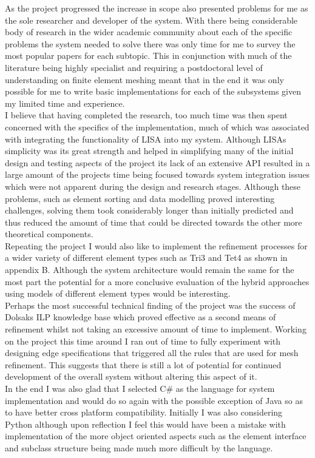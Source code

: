 \noindent
As the project progressed the increase in scope also presented problems for me as the sole researcher and developer of the system. With there being considerable body of research in the wider academic community about each of the specific problems the system needed to solve there was only time for me to survey the most popular papers for each subtopic. This in conjunction with much of the literature being highly specialist and requiring a postdoctoral level of understanding on finite element meshing meant that in the end it was only possible for me to write basic implementations for each of the subsystems given my limited time and experience. \\ 
  
\noindent
I believe that having completed the research, too much time was then spent concerned with the specifics of the implementation, much of which was associated with integrating the functionality of LISA into my system. Although LISAs simplicity was its great strength and helped in simplifying many of the initial design and testing aspects of the project its lack of an extensive API resulted in a large amount of the projects time being focused towards system integration issues which were not apparent during the design and research stages. Although these problems, such as element sorting and data modelling proved interesting challenges, solving them took considerably longer than initially predicted and thus reduced the amount of time that could be directed towards the other more theoretical components. \\ 


\noindent
Repeating the project I would also like to implement the refinement processes for a wider variety of different element types such as Tri3 and Tet4 as shown in appendix B. Although the system architecture would remain the same for the most part the potential for a more conclusive evaluation of the hybrid approaches using models of different element types would be interesting. \\ 

\noindent
Perhaps the most successful technical finding of the project was the success of Dolsaks ILP knowledge base which proved effective as a second means of refinement whilst not taking an excessive amount of time to implement. Working on the project this time around I ran out of time to fully experiment with designing edge specifications that triggered all the rules that are used for mesh refinement. This suggests that there is still a lot of potential for continued development of the overall system without altering this aspect of it. \\ 

\noindent
In the end I was also glad that I selected C\# as the language for system implementation and would do so again with the possible exception of Java so as to have better cross platform compatibility. Initially I was also considering  Python although upon reflection I feel this would have been a mistake with implementation of the more object oriented aspects such as the element interface and subclass structure being made much more difficult by the language. \\
